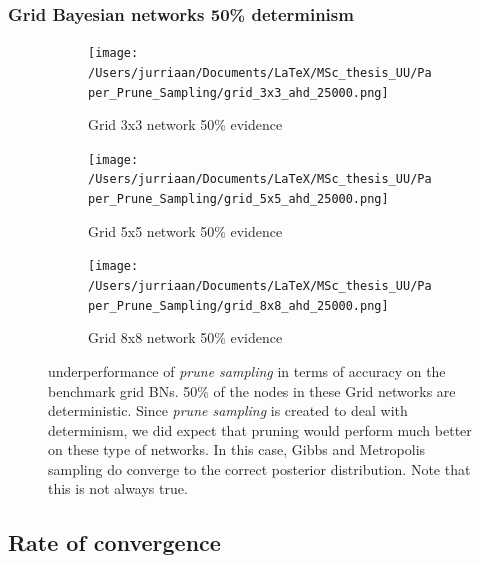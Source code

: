 \documentclass[a4paper, twoside, 11pt]{report}
\theoremstyle{plain}
\theoremstyle{definition}
\theoremstyle{remark}
\newcommand{\ps}{\textit{prune sampling }}
\begin{document}
\subsubsection{Grid Bayesian networks 50\% determinism}
\begin{figure}[H]
\centering
\begin{subfigure}{0.49\textwidth}
\texttt{[image: /Users/jurriaan/Documents/LaTeX/MSc\_thesis\_UU/Paper\_Prune\_Sampling/grid\_3x3\_ahd\_25000.png]}
\caption{Grid 3x3 network 50\% evidence}%
\label{grid_3x3}%
\end{subfigure}\hfill%
\begin{subfigure}{0.49\textwidth}
\texttt{[image: /Users/jurriaan/Documents/LaTeX/MSc\_thesis\_UU/Paper\_Prune\_Sampling/grid\_5x5\_ahd\_25000.png]}
\caption{Grid 5x5 network 50\% evidence}%
\label{grid_5x5}%
\end{subfigure}
\begin{subfigure}{0.49\textwidth}
\texttt{[image: /Users/jurriaan/Documents/LaTeX/MSc\_thesis\_UU/Paper\_Prune\_Sampling/grid\_8x8\_ahd\_25000.png]}
\caption{Grid 8x8 network 50\% evidence}%
\label{grid_8x8}%
\end{subfigure}\hfill%
\caption{underperformance of \ps in terms of accuracy on the benchmark grid BNs. 50\% of the nodes in these Grid networks are deterministic. Since \ps is created to deal with determinism, we did expect that pruning would perform much better on these type of networks. In this case, Gibbs and Metropolis sampling do converge to the correct posterior distribution. Note that this is not always true.}
\label{results1}
\end{figure}


\subsection{Rate of convergence}
\end{document}
